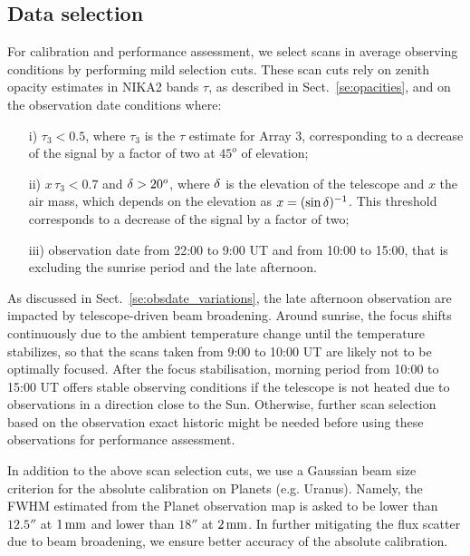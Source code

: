


\subsection{Data selection}%
\label{se:data_selection}

For calibration and performance assessment, we select scans in average
observing conditions by performing mild selection cuts. These scan
cuts rely on zenith opacity estimates in NIKA2 bands $\tau$, as
described in Sect.~\ref{se:opacities}, and on the observation date
conditions where:
%
\begin{itemize}
\item[i)] $\tau_{3} < 0.5$, where $\tau_{3}$ is the $\tau$ estimate for
  Array 3, corresponding to a decrease of the signal by a factor of
  two at $45^{o}$ of elevation;
\item[ii)] $x\, \tau_{3} < 0.7$ and $\delta > 20^{o}$, where $\delta$ is the
  elevation of the telescope and $x$ the
  air mass, which depends on the elevation as $x=(\sin{\delta})^{-1}$. This
  threshold corresponds to a decrease of the signal by a factor of two;
\item[iii)] observation date from 22:00 to 9:00 UT and from 10:00 to
  15:00, that is excluding the sunrise period and the late afternoon.
\end{itemize}
%
As discussed in Sect.~\ref{se:obsdate_variations}, the late afternoon
observation are impacted by telescope-driven beam broadening. Around
sunrise, the focus shifts continuously due to the ambient temperature
change until the temperature stabilizes, so that the scans taken from
9:00 to 10:00 UT are likely not to be optimally focused.
After the focus stabilisation, morning period 
from 10:00 to 15:00 UT offers stable observing conditions
if the telescope is not heated due to observations in a
direction close to the Sun.  Otherwise, further scan selection based on the
observation exact historic might be needed before using these
observations for performance assessment.

   
In addition to the above scan selection cuts, we use a Gaussian beam
size criterion for the absolute calibration on Planets
(e.g. Uranus). Namely, the FWHM estimated from the Planet observation
map is asked to be lower than $12.5''$ at $1\,\rm{mm}$ and lower than $18''$ at
$2\,\rm{mm}$. In further mitigating the flux scatter due to beam broadening, we
ensure better accuracy of the absolute calibration.  




